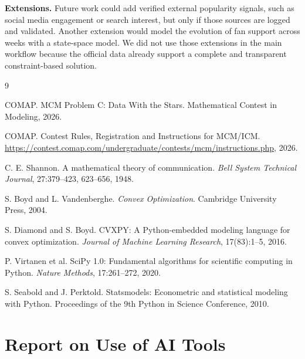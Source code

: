 \documentclass[12pt]{article}
\begin{document}
\textbf{Extensions.} Future work could add verified external popularity
signals, such as social media engagement or search interest, but only if those
sources are logged and validated. Another extension would model the evolution
of fan support across weeks with a state-space model. We did not use those
extensions in the main workflow because the official data already support a
complete and transparent constraint-based solution.

\clearpage
{}
{}
\begin{thebibliography}{9}

COMAP.
 MCM Problem C: Data With the Stars.
\newblock Mathematical Contest in Modeling, 2026.

COMAP.
\newblock Contest Rules, Registration and Instructions for MCM/ICM.
\newblock \url{https://contest.comap.com/undergraduate/contests/mcm/instructions.php}, 2026.

C. E. Shannon.
\newblock A mathematical theory of communication.
\newblock \emph{Bell System Technical Journal}, 27:379--423, 623--656, 1948.

S. Boyd and L. Vandenberghe.
\newblock \emph{Convex Optimization}.
\newblock Cambridge University Press, 2004.

S. Diamond and S. Boyd.
\newblock CVXPY: A Python-embedded modeling language for convex optimization.
\newblock \emph{Journal of Machine Learning Research}, 17(83):1--5, 2016.

P. Virtanen et al.
\newblock SciPy 1.0: Fundamental algorithms for scientific computing in Python.
\newblock \emph{Nature Methods}, 17:261--272, 2020.

S. Seabold and J. Perktold.
\newblock Statsmodels: Econometric and statistical modeling with Python.
\newblock Proceedings of the 9th Python in Science Conference, 2010.

\end{thebibliography}

\clearpage
\section*{Report on Use of AI Tools}
\end{document}
